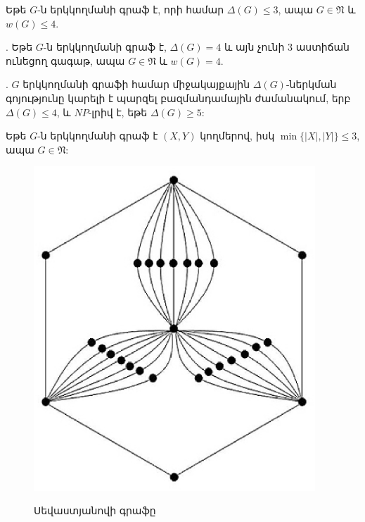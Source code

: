 \begin{hide}
\begin{theorem}
\label{t3_Hansen_Delta3}\cite{Hansen1992} Եթե $G$-ն երկկողմանի գրաֆ է, որի համար 
$\Delta(G)\leq 3$, ապա $G\in \mathfrak{N}$ և $w(G)\leq 4$.
\end{theorem}

\begin{theorem}
\label{t3_Giaro_Delta4_no3}\cite{Giaro1997}. Եթե $G$-ն երկկողմանի գրաֆ է, 
$\Delta(G)=4$ և այն չունի $3$ աստիճան ունեցող գագաթ, ապա $G\in
\mathfrak{N}$ և $w(G)=4$.
\end{theorem}

\begin{theorem}
\label{t3_Giaro_complexity}\cite{Giaro1997}. $G$ երկկողմանի գրաֆի համար միջակայքային $\Delta(G)$-ներկման գոյությունը կարելի է պարզել բազմանդամային ժամանակում, երբ $\Delta(G)\leq 4$, և $NP$-լրիվ է, եթե $\Delta(G)\geq 5$:
\end{theorem}

\begin{theorem}
\label{t3_GiaroKubaleMalafiejski_min3}\cite{GiaroKubaleMalafiejski1999} Եթե $G$-ն երկկողմանի գրաֆ է $(X,Y)$ կողմերով, իսկ $\min \{\vert X\vert, \vert Y\vert\}\leq 3$, ապա $G\in
\mathfrak{N}$:
\end{theorem}

\begin{figure}[h]
\begin{center}
\includegraphics[width=25pc]{figures/sevastyanov.eps}\\
\caption{Սեվաստյանովի գրաֆը}\label{f3_sevastyanov}
\end{center}
\end{figure}
\end{hide}
